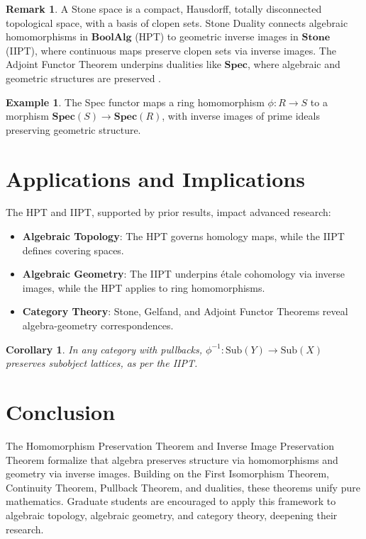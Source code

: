 \documentclass{article}
\theoremstyle{plain}
\newtheorem{corollary}{Corollary}
\theoremstyle{definition}
\newtheorem{example}{Example}
\newtheorem{remark}{Remark}
\newcommand{\Spec}{\mathbf{Spec}}
\begin{document}
\begin{remark}
A Stone space is a compact, Hausdorff, totally disconnected topological space,
with a basis of clopen sets. Stone Duality \cite{johnstone, takesaki} connects
algebraic homomorphisms in \(\mathbf{BoolAlg}\) (HPT) to geometric inverse
images in \(\mathbf{Stone}\) (IIPT), where continuous maps preserve clopen
sets via inverse images. The Adjoint Functor Theorem \cite{mac} underpins
dualities like $\Spec$, where algebraic and geometric structures are
preserved \cite{hart}.
\end{remark}

\begin{example}
The Spec functor maps a ring homomorphism $\phi: R \to S$ to a
morphism $\Spec(S) \to \Spec(R)$, with inverse images
of prime ideals preserving geometric structure.
\end{example}

\section{Applications and Implications}
The HPT and IIPT, supported by prior results, impact advanced research:

\begin{itemize}
    \item \textbf{Algebraic Topology}: The HPT governs homology maps, while the IIPT defines covering spaces.
    \item \textbf{Algebraic Geometry}: The IIPT underpins étale cohomology via inverse images, while the HPT applies to ring homomorphisms.
    \item \textbf{Category Theory}: Stone, Gelfand, and Adjoint Functor Theorems reveal algebra-geometry correspondences.
\end{itemize}

\begin{corollary}
In any category with pullbacks, \(\phi^{-1}: \text{Sub}(Y) \to \text{Sub}(X)\) preserves subobject lattices, as per the IIPT.
\end{corollary}

\section{Conclusion}
The Homomorphism Preservation Theorem and Inverse Image Preservation Theorem formalize that algebra preserves structure via homomorphisms and geometry via inverse images. Building on the First Isomorphism Theorem, Continuity Theorem, Pullback Theorem, and dualities, these theorems unify pure mathematics. Graduate students are encouraged to apply this framework to algebraic topology, algebraic geometry, and category theory, deepening their research.
\end{document}
